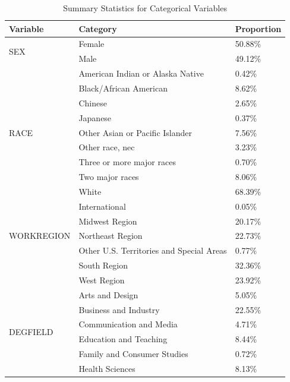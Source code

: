 \documentclass{article}
\begin{document}
    \begin{table}[ht]
    \centering
    \caption{Summary Statistics for Categorical Variables}
    \begin{tabular}{@{}lll@{}}
    \toprule
    Variable & Category & Proportion \\ 
    \midrule
    \multirow{2}{*}{SEX} & Female & 50.88\% \\
                         & Male & 49.12\% \\
    \midrule
    \multirow{9}{*}{RACE} & American Indian or Alaska Native & 0.42\% \\
                          & Black/African American & 8.62\% \\
                          & Chinese & 2.65\% \\
                          & Japanese & 0.37\% \\
                          & Other Asian or Pacific Islander & 7.56\% \\
                          & Other race, nec & 3.23\% \\
                          & Three or more major races & 0.70\% \\
                          & Two major races & 8.06\% \\
                          & White & 68.39\% \\
    \midrule
    \multirow{5}{*}{WORKREGION} & International & 0.05\% \\
                                & Midwest Region & 20.17\% \\
                                & Northeast Region & 22.73\% \\
                                & Other U.S. Territories and Special Areas & 0.77\% \\
                                & South Region & 32.36\% \\
                                & West Region & 23.92\% \\
    \midrule
    \multirow{13}{*}{DEGFIELD} & Arts and Design & 5.05\% \\
                               & Business and Industry & 22.55\% \\
                               & Communication and Media & 4.71\% \\
                               & Education and Teaching & 8.44\% \\
                               & Family and Consumer Studies & 0.72\% \\
                               & Health Sciences & 8.13\% \\

\end{tabular}
\end{table}
\end{document}
